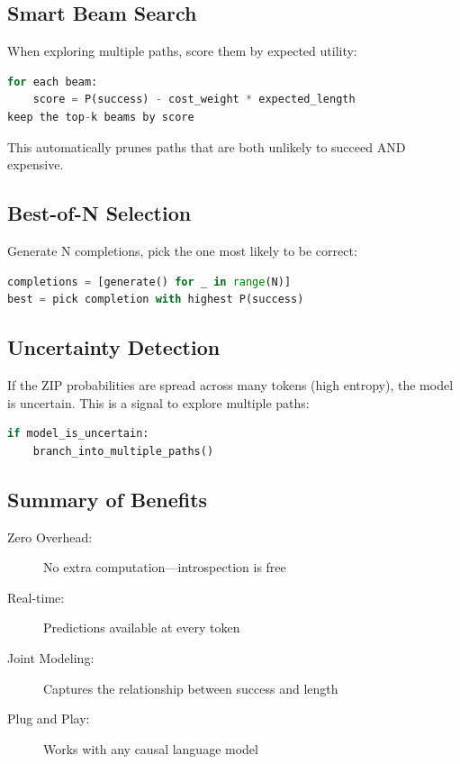 \documentclass[11pt,a4paper]{article}
\begin{document}
\subsection{Smart Beam Search}

When exploring multiple paths, score them by expected utility:

\begin{lstlisting}[language=Python]
for each beam:
    score = P(success) - cost_weight * expected_length
keep the top-k beams by score
\end{lstlisting}

This automatically prunes paths that are both unlikely to succeed AND expensive.

\subsection{Best-of-N Selection}

Generate N completions, pick the one most likely to be correct:

\begin{lstlisting}[language=Python]
completions = [generate() for _ in range(N)]
best = pick completion with highest P(success)
\end{lstlisting}

\subsection{Uncertainty Detection}

If the ZIP probabilities are spread across many tokens (high entropy), the model is uncertain. This is a signal to explore multiple paths:

\begin{lstlisting}[language=Python]
if model_is_uncertain:
    branch_into_multiple_paths()
\end{lstlisting}

\subsection{Summary of Benefits}

\begin{description}
    \item[Zero Overhead:] No extra computation---introspection is free
    \item[Real-time:] Predictions available at every token
    \item[Joint Modeling:] Captures the relationship between success and length
    \item[Plug and Play:] Works with any causal language model
\end{description}
\end{document}
